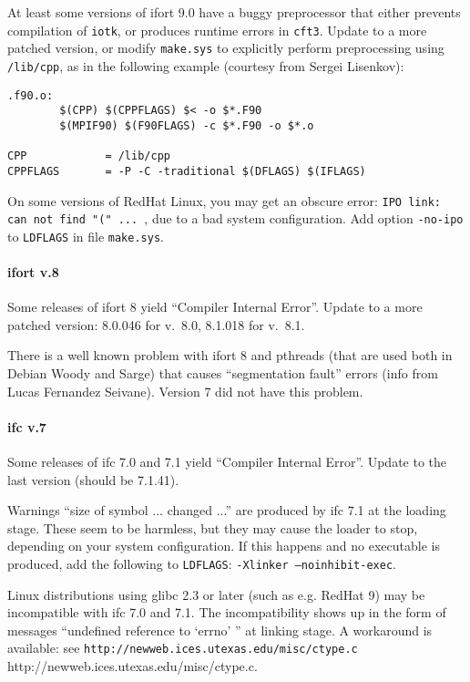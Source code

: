 \documentclass[12pt,a4paper]{article}
\begin{document}
At least some versions of ifort 9.0 have a buggy preprocessor that 
either prevents compilation of \texttt{iotk}, or produces runtime 
errors in \texttt{cft3}. Update to a more patched version, or
modify \texttt{make.sys} to explicitly perform preprocessing 
using \texttt{/lib/cpp}, as in the following example (courtesy 
from Sergei Lisenkov):
\begin{verbatim}
.f90.o:
        $(CPP) $(CPPFLAGS) $< -o $*.F90
        $(MPIF90) $(F90FLAGS) -c $*.F90 -o $*.o

CPP            = /lib/cpp
CPPFLAGS       = -P -C -traditional $(DFLAGS) $(IFLAGS)
\end{verbatim}

On some versions of RedHat Linux, you may get an obscure error: 
\texttt{IPO link: can not find "(" ... }, due to a bad system
configuration. Add option \texttt{-no-ipo} to \texttt{LDFLAGS} 
in file \texttt{make.sys}.

\paragraph{ifort v.8}

Some releases of ifort 8 yield ``Compiler Internal Error''. 
Update to a more patched version: 8.0.046 for v.~8.0,
8.1.018 for v.~8.1.

There is a well known problem with ifort 8 and pthreads 
(that are used both in Debian Woody and Sarge) that causes
``segmentation fault'' errors (info from Lucas Fernandez Seivane). 
Version 7 did not have this problem.

\paragraph{ifc v.7}

Some releases of ifc 7.0 and 7.1 yield ``Compiler Internal 
Error''. Update to the last version (should be 7.1.41).

Warnings ``size of symbol ... changed ...'' are produced by ifc 7.1 at
the loading stage.
These seem to be harmless, but they may cause the loader to stop,
depending on your system configuration.
If this happens and no executable is produced, add the following to
\texttt{LDFLAGS}: \texttt{-Xlinker --noinhibit-exec}.

Linux distributions using glibc 2.3 or later (such as e.g. RedHat 9)
may be incompatible with ifc 7.0 and 7.1.
The incompatibility shows up in the form of messages ``undefined
reference to `errno' '' at linking stage.
A workaround is available: see
\htmladdnormallink%
{\texttt{http://newweb.ices.utexas.edu/misc/ctype.c}}%
{http://newweb.ices.utexas.edu/misc/ctype.c}.
\end{document}
